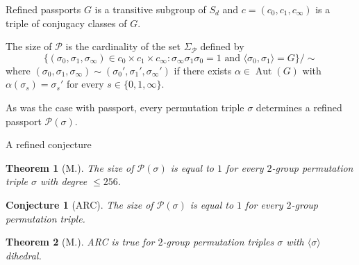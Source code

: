 \documentclass[xcolor=dvipsnames]{beamer}
\theoremstyle{plain}
\newtheorem*{thm}{Theorem}
\newtheorem*{conj}{Conjecture}
\DeclareMathOperator{\Aut}{Aut}
\begin{document}
{\begin{frame}{Refined passports}
      $G$ is a transitive subgroup of $S_d$
      and $c = (c_0,c_1,c_\infty)$
      is a triple of conjugacy classes
      of $G$.
      \pause\par
      The size of
      $\mathscr{P}$ is the cardinality of the
      set
      $\Sigma_\mathscr{P}$
      defined by
      \[
        \Big\{
          (\sigma_0,\sigma_1,\sigma_\infty)\in c_0\times c_1\times c_\infty :
          \sigma_\infty\sigma_1\sigma_0=1
          \text{ and }
          \langle\sigma_0,\sigma_1\rangle=G
        \Big\}/\!\!\sim
      \]
      where
      $(\sigma_0,\sigma_1,\sigma_\infty)\sim
      (\sigma_0',\sigma_1',\sigma_\infty')$
      if there exists $\alpha\in\Aut(G)$
      with $\alpha(\sigma_s) = \sigma_s'$ for
      every $s\in\{0,1,\infty\}$.
      \pause\par
      As was the case with passport,
      every permutation triple $\sigma$
      determines a refined passport
      $\mathscr{P}(\sigma)$.
    \end{frame}
    \begin{frame}{A refined conjecture}
      \begin{thm}[M.]
        \vspace{1pt}
        The size of $\mathscr{P}(\sigma)$ is
        equal to $1$ for every
        $2$-group permutation triple
        $\sigma$ with degree $\leq 256$.
      \end{thm}
      \pause\par
      \begin{conj}[ARC]
        \vspace{1pt}
        The size of $\mathscr{P}(\sigma)$ is
        equal to $1$ for every
        $2$-group permutation triple.
      \end{conj}
      \pause\par
      \begin{thm}[M.]
        \vspace{1pt}
        ARC is true for $2$-group permutation triples $\sigma$
        with $\langle\sigma\rangle$ dihedral.
      \end{thm}
    \end{frame}
  }
\end{document}
